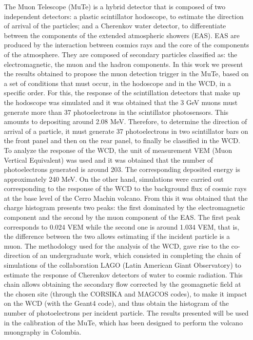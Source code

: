 \documentclass[12pt,oneside,openany,letter]{book}
\begin{document}
{The Muon Telescope (MuTe) is a hybrid detector that is composed of two independent detectors: a plastic scintillator hodoscope, to estimate the direction of arrival of the particles; and a Cherenkov water detector, to differentiate between the components of the extended atmospheric showers (EAS). EAS are produced by the interaction between  cosmics rays and the core of the components of the atmosphere. They are composed of secondary particles classified as: the electromagnetic, the muon and the hadron components. In this work we present the results obtained to propose the muon detection trigger in the MuTe, based on a set of conditions that must occur, in the hodoscope and in the WCD, in a specific order. For this, the response of the scintillation detectors that make up the hodoscope was simulated and it was obtained that the 3 GeV muons must generate more than 37 photoelectrons in the scintillator photosensors. This amounts to depositing around 2.08 MeV. Therefore, to determine the direction of arrival of a particle, it must generate 37 photoelectrons in two scintillator bars on the front panel and then on the rear panel, to finally be classified in the WCD. To analyze the response of the WCD, the unit of measurement VEM (Muon Vertical Equivalent) was used and it was obtained that the number of photoelectrons generated is around 203. The corresponding deposited energy is approximately 240 MeV. On the other hand, simulations were carried out corresponding to the response of the WCD to the background flux of cosmic rays at the base level of the Cerro Machin volcano. From this it was obtained that the charge histogram presents two peaks: the first dominated by the electromagnetic component and the second by the muon component of the EAS. The first peak corresponds to 0.024 VEM while the second one is around 1.034 VEM, that is, the difference between the two allows estimating if the incident particle is a muon. The methodology used for the analysis of the WCD, gave rise to the co-direction of an undergraduate work, which consisted in completing the chain of simulations of the collaboration LAGO (Latin American Giant Observatory) to estimate the response of Cherenkov detectors of water to cosmic radiation. This chain allows obtaining the secondary flow corrected by the geomagnetic field at the chosen site (through the CORSIKA and MAGCOS codes), to make it impact on the WCD (with the Geant4 code), and thus obtain the histogram of the number of photoelectrons per incident particle. The results presented will be used in the calibration of the MuTe, which has been designed to perform the volcano muongraphy in Colombia.}
\end{document}
